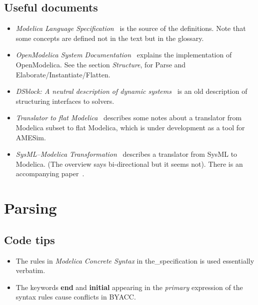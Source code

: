 \documentclass[10pt,b5paper]{article}
\begin{document}

\subsection{Useful documents}

\begin{itemize}

\item {\it{}Modelica Language Specification}~\cite{specification34} is
the source of the definitions.  Note that some concepts are defined
not in the text but in the glossary.

\item {\it{}OpenModelica System Documentation}~\cite{openmodelica2014}
explains the implementation of OpenModelica.  See the section
{\it{}Structure}, for Parse and Elaborate/Instantiate/Flatten.

\item {\it{}DSblock: A neutral description of dynamic
systems}~\cite{otter1994} is an old description of structuring
interfaces to solvers.

\item {\it{}Translator to flat Modelica}~\cite{lms2007} describes some
notes about a translator from Modelica subset to flat Modelica, which
is under development as a tool for AMESim.

\item {\it{}SysML--Modelica Transformation}~\cite{omg2012} describes a
translator from SysML to Modelica.  (The overview says bi-directional
but it seems not).  There is an accompanying paper~\cite{paredis2010}.

\end{itemize}


\section{Parsing}


\subsection{Code tips}

\begin{itemize}

\item The rules in {\it{}Modelica Concrete Syntax\/} in
the_specification is used essentially verbatim.

\item The keywords {\bf{}end} and {\bf{}initial} appearing in the
{\it{}primary\/} expression of the syntax rules cause conflicts in
BYACC\@.


\end{itemize}
\end{document}
